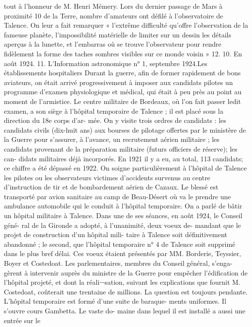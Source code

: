 \documentclass[a4paper,11pt]{book}
\begin{document}
tout à l'honneur de M. Henri Mémery.
Lors du dernier passage de Mars à proximité 10 de la
Terre, nombre d'amateurs ont défilé à l'observatoire de
Talence. On leur a fait remarquer « l'extrême difficulté
qu'offre l'observation de la fameuse planète, l'impossibilité
matérielle de limiter sur un dessin les détails aperçus à
la lunette, et l'embarras où se trouve l'observateur pour
rendre fidèlement la forme des taches sombres visibles
sur ce monde voisin » 12.
10. En août 1924.
11. L'Information astronomique n° 1, septembre 1924.Les établissements hospitaliers
Durant la guerre, afin de former rapidement de bons
aviateurs, on était arrivé progressivement à imposer aux
candidats pilotes un programme d'examen physiologique
et médical, qui était à peu près au point au moment de
l'armistice. Le centre militaire de Bordeaux, où l'on fait
passer ledit examen, a son siège à l'hôpital temporaire
de Talence ; il est placé sous la direction du 18e corps d'ar-
mée. On y visite trois ordres de candidats : les candidats
civils (dix-huit ans) aux bourses de pilotage offertes par
le ministère de la Guerre pour s'assurer, à l'avance, un
recrutement aérien militaire ; les candidats provenant de la
préparation militaire (futurs officiers de réserve); les can-
didats militaires déjà incorporés. En 1921 il y a eu, au
total, 113 candidats; ce chiffre a été dépassé en 1922.
On soigne particulièrement à l'hôpital de Talence les
pilotes ou les observateurs victimes d'accidents survenus
au centre d'instruction de tir et de bombardement aérien
de Cazaux. Le blessé est transporté par avion sanitaire
au camp de Beau-Désert où va le prendre une ambulance
automobile qui le conduit à l'hôpital temporaire.
On a parlé de bâtir un hôpital militaire à Talence.
Dans une de ses séances, en août 1924, le Conseil géné-
ral de la Gironde a adopté, à l'unanimité, deux voeux de-
mandant que le projet de construction d'un hôpital mili-
taire à Talence soit définitivement abandonné ; le second,
que l'hôpital temporaire n° 4 de Talence soit supprimé
dans le plus bref délai. Ces voeux étaient présentés par
MM. Borderie, Teyssier, Boyer et Costedoat.
Les parlementaires, membres du Conseil général, s'enga-
gèrent à intervenir auprès du ministre de la Guerre pour
empêcher l'édification de l'hôpital projeté, et dont la réali¬sation, suivant les explications que fournit M. Costedoat,
coûterait une trentaine de millions.
La question est toujours pendante.
L'hôpital temporaire est formé d'une suite de baraque-
ments uniformes. Il s'ouvre cours Gambetta. Le vaste do-
maine dans lequel il est installé a aussi une entrée sur le
\end{document}
